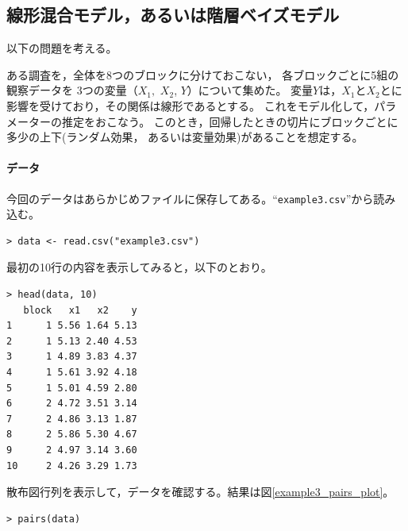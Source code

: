 \documentclass[11pt,uplatex]{jsarticle}
\begin{document}

\subsection{線形混合モデル，あるいは階層ベイズモデル}
\label{mixed_model}

以下の問題を考える。
\vspace{1zw}

\hspace{18mm}
\begin{minipage}{100mm}
\begin{breakbox}
\noindent
ある調査を，全体を8つのブロックに分けておこない，
各ブロックごとに5組の観察データを
3つの変量（$X_1,$ $X_2$, $Y$）について集めた。
変量$Y$は，$X_1$と$X_2$とに影響を受けており，その関係は線形であるとする。
これをモデル化して，パラメーターの推定をおこなう。
このとき，回帰したときの切片にブロックごとに多少の上下(ランダム効果，
あるいは変量効果)があることを想定する。
\end{breakbox}
\end{minipage}

\vspace{1zw}

\paragraph{データ}
今回のデータはあらかじめファイルに保存してある。``\texttt{example3.csv}''から読み込む。
\begin{lstlisting}
> data <- read.csv("example3.csv")
\end{lstlisting}


最初の10行の内容を表示してみると，以下のとおり。
\begin{lstlisting}
> head(data, 10)
   block   x1   x2    y
1      1 5.56 1.64 5.13
2      1 5.13 2.40 4.53
3      1 4.89 3.83 4.37
4      1 5.61 3.92 4.18
5      1 5.01 4.59 2.80
6      2 4.72 3.51 3.14
7      2 4.86 3.13 1.87
8      2 5.86 5.30 4.67
9      2 4.97 3.14 3.60
10     2 4.26 3.29 1.73
\end{lstlisting}

散布図行列を表示して，データを確認する。結果は図\ref{example3_pairs_plot}。

\begin{lstlisting}
> pairs(data)
\end{lstlisting}
\end{document}
